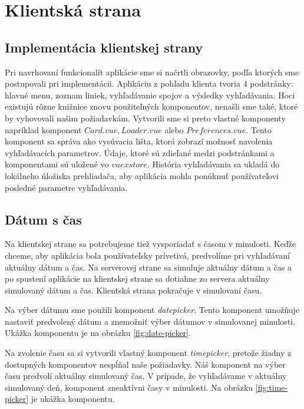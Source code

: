 \section{Klientská strana} 


\subsection{Implementácia klientskej strany} 
Pri navrhovaní funkcionalít aplikácie sme si načrtli obrazovky, podľa ktorých sme postupovali pri implementácii. 
Aplikáciu z pohľadu klienta tvoria 4 podstránky: hlavné menu, zoznam liniek, vyhľadávanie spojov a výsledky vyhľadávania. Hoci existujú rôzne knižnice znovu použiteľných komponentov, nenašli sme také, ktoré by vyhovovali našim požiadavkám. Vytvorili sme si preto vlastné komponenty napríklad komponent $Card.vue, Loader.vue$ alebo $Preferences.vue$. Tento komponent sa správa ako vysúvacia lišta, ktorá zobrazí možnosť navolenia vyhľadávacích parametrov. Údaje, ktoré sú zdieľané medzi podstránkami a komponentami sú uložené vo $vuex store$. História vyhľadávania sa ukladá do lokálneho úložiska prehliadača, aby aplikácia mohla ponúknuť používateľovi posledné parametre vyhľadávania.


\subsection{Dátum s čas}
Na klientskej strane sa potrebujeme tiež vysporiadať s časom v minulosti. Keďže chceme, aby aplikácia bola používateľsky prívetivá, predvolíme pri vyhľadávaní aktuálny dátum a čas. Na serverovej strane sa simuluje aktuálny dátum a čas a po spustení aplikácie na klientskej strane sa dotiahne zo servera aktuálny simulovaný dátum a čas. Klientská strana pokračuje v simulovaní času. 

Na výber dátumu sme použili komponent \textit{datepicker}. Tento komponent umožňuje nastaviť predvolený dátum a znemožniť výber dátumov v simulovanej minulosti. Ukážka komponentu je na obrázku \ref{fig:date-picker}.

Na zvolenie času sa si vytvorili vlastný komponent \textit{timepicker}, pretože žiadny z dostupných komponentov nespĺňal naše požiadavky. Náš komponent na výber času predvolí aktuálny simulovaný čas. V prípade, že vyhľadávame v aktuálny simulovaný deň, komponent zneaktívni časy v minulosti. Na obrázku \ref{fig:time-picker} je ukážka komponentu.

